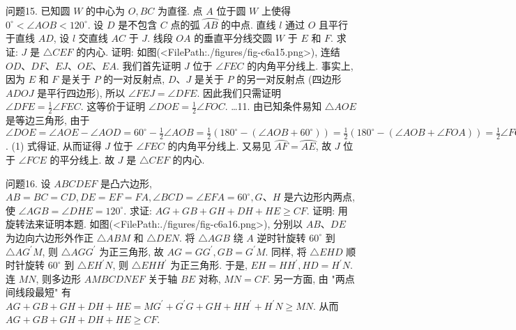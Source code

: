 问题15. 已知圆 $W$ 的中心为 $O, B C$ 为直径.
点 $A$ 位于圆 $W$ 上使得 $0^{\circ}<\angle A O B< 120^{\circ}$. 设 $D$ 是不包含 $C$ 点的弧 $\overparen{A B}$ 的中点.
直线 $l$ 通过 $O$ 且平行于直线 $A D$, 设 $l$ 交直线 $A C$ 于 $J$. 线段 $O A$ 的垂直平分线交圆 $W$ 于 $E$ 和 $F$. 求证: $J$ 是 $\triangle C E F$ 的内心.
证明: 如图(<FilePath:./figures/fig-c6a15.png>), 连结 $O D 、 D F 、 E J 、 O E 、 E A$. 我们首先证明 $J$ 位于 $\angle F E C$ 的内角平分线上.
事实上, 因为 $E$ 和 $F$ 是关于 $P$ 的一对反射点, $D 、 J$ 是关于 $P$ 的另一对反射点 (四边形 $A D O J$ 是平行四边形), 所以 $\angle F E J=\angle D F E$.
因此我们只需证明 $\angle D F E=\frac{1}{2} \angle F E C$. 这等价于证明 $\angle D O E=\frac{1}{2} \angle F O C$. …11. 由已知条件易知
$\triangle A O E$ 是等边三角形, 由于 $\angle D O E=\angle A O E-\angle A O D=60^{\circ}-\frac{1}{2} \angle A O B= \frac{1}{2}\left(180^{\circ}-\left(\angle A O B+60^{\circ}\right)\right)=\frac{1}{2}\left(180^{\circ}-(\angle A O B+\angle F O A)\right)=\frac{1}{2} \angle F O C$.
(1) 式得证, 从而证得 $J$ 位于 $\angle F E C$ 的内角平分线上.
又易见 $\overparen{A F}=\overparen{A E}$, 故 $J$ 位于 $\angle F C E$ 的平分线上.
故 $J$ 是 $\triangle C E F$ 的内心.



问题16. 设 $A B C D E F$ 是凸六边形, $A B=B C=C D, D E=E F=F A, \angle B C D= \angle E F A=60^{\circ}, G 、 H$ 是六边形内两点, 使 $\angle A G B=\angle D H E=120^{\circ}$. 求证: $A G+G B+G H+D H+H E \geqslant C F$.
证明: 用旋转法来证明本题.
如图(<FilePath:./figures/fig-c6a16.png>), 分别以 $A B 、 D E$ 为边向六边形外作正 $\triangle A B M$ 和 $\triangle D E N$. 将 $\triangle A G B$ 绕 $A$ 逆时针旋转 $60^{\circ}$ 到 $\triangle A G^{\prime} M$, 则 $\triangle A G G^{\prime}$ 为正三角形, 故 $A G=G G^{\prime}, G B=G^{\prime} M$. 同样, 将 $\triangle E H D$ 顺时针旋转 $60^{\circ}$ 到 $\triangle E H^{\prime} N$,
则 $\triangle E H H^{\prime}$ 为正三角形.
于是, $E H=H H^{\prime}, H D=H^{\prime} N$. 连 $M N$, 则多边形 $A M B C D N E F$ 关于轴 $B E$ 对称, $M N=C F$. 另一方面, 由 "两点间线段最短" 有 $A G+G B+G H+D H+H E=M G^{\prime}+G^{\prime} G+G H+H H^{\prime}+H^{\prime} N \geqslant M N$. 从而 $A G+G B+G H+D H+H E \geqslant C F$.


